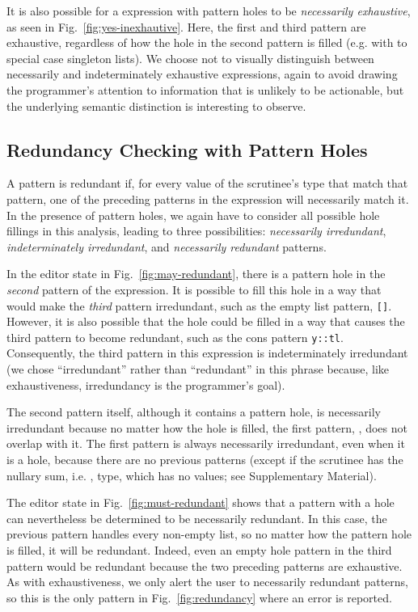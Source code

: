 It is also possible for a  expression with pattern holes to be \emph{necessarily exhaustive}, as seen in Fig.~\ref{fig:yes-inexhautive}. Here, the first and third pattern are
exhaustive, regardless of how the hole in the second pattern is filled (e.g. with \li{[]} to special case singleton lists). We choose not to visually distinguish between necessarily and indeterminately exhaustive  expressions, again to avoid drawing
the programmer's attention to information that is unlikely to be actionable, but the
underlying semantic distinction is interesting to observe.

\subsection{Redundancy Checking with Pattern Holes}
\label{sec:hazel-redundancy}
A pattern is redundant if, for every value of the scrutinee's type that match that pattern, one of the preceding patterns in the  expression will necessarily 
match it. In the presence of pattern holes, we again have to consider all possible hole fillings in this analysis, leading to three possibilities: \emph{necessarily irredundant}, \emph{indeterminately irredundant}, and \emph{necessarily redundant} patterns.

In the editor state in Fig.~\ref{fig:may-redundant}, there is a pattern hole in the \emph{second} pattern of the  expression. It is possible to fill this hole in a way that would make the \emph{third} pattern irredundant, such as the empty list pattern, \texttt{[]}. 
However, it is also possible that the hole could be filled in a way that causes the third pattern to become redundant, such as the cons pattern \texttt{y::tl}. Consequently, the third pattern in this  expression is indeterminately irredundant (we chose ``irredundant'' rather than ``redundant'' in this phrase because, like exhaustiveness, irredundancy is the programmer's goal).

The second pattern itself, although it contains a pattern hole, is necessarily irredundant because no matter how the hole is filled, the first pattern, \li{[]}, does not overlap with it. The first pattern is always necessarily irredundant, even when it is a hole, because
there are no previous patterns (except if the scrutinee has the nullary sum, i.e. , type, which has no values; see Supplementary Material).

The editor state in Fig.~\ref{fig:must-redundant} shows that a pattern with a hole can nevertheless be determined to be necessarily redundant.
In this case, the previous pattern handles every non-empty list, so no matter how the pattern hole is filled, it will be redundant.
Indeed, even an empty hole pattern in the third pattern would be redundant because the two preceding patterns are exhaustive.
 As with exhaustiveness, we only alert
the user to necessarily redundant patterns, so this is the only pattern in Fig.~\ref{fig:redundancy} where an error is reported.

